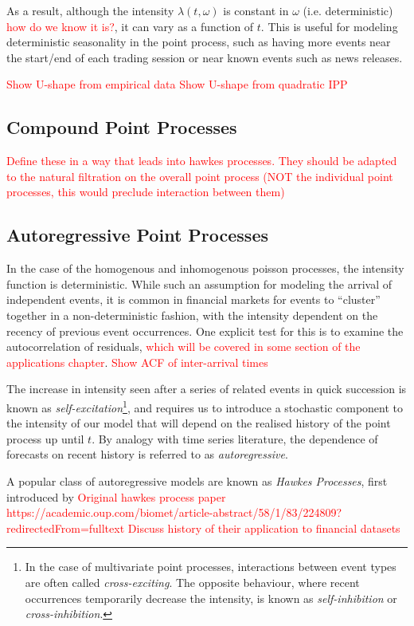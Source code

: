 \documentclass[honours,12pt]{unswthesis}
\numberwithin{equation}{section}
\begin{document}
As a result, although the intensity $\lambda(t,\omega)$ is constant in $\omega$ (i.e. deterministic) \textcolor{red}{how do we know it is?}, it can vary as a function of $t$. This is useful for modeling deterministic seasonality in the point process, such as having more events near the start/end of each trading session or near known events such as news releases.

\textcolor{red}{Show U-shape from empirical data}
\textcolor{red}{Show U-shape from quadratic IPP}

\subsection{Compound Point Processes}
\textcolor{red}{Define these in a way that leads into hawkes processes. They should be adapted to the natural filtration on the overall point process (NOT the individual point processes, this would preclude interaction between them)}

\subsection{Autoregressive Point Processes}
In the case of the homogenous and inhomogenous poisson processes, the intensity function is deterministic. While such an assumption for modeling the arrival of independent events, it is common in financial markets for events to ``cluster'' together in a non-deterministic fashion, with the intensity dependent on the recency of previous event occurrences. One explicit test for this is to examine the autocorrelation of residuals, \textcolor{red}{which will be covered in some section of the applications chapter}.
\textcolor{red}{Show ACF of inter-arrival times}

The increase in intensity seen after a series of related events in quick succession is known as \textit{self-excitation}\footnote{In the case of multivariate point processes, interactions between event types are often called \textit{cross-exciting}. The opposite behaviour, where recent occurrences temporarily decrease the intensity, is known as \textit{self-inhibition} or \textit{cross-inhibition}.}, and requires us to introduce a stochastic component to the intensity of our model that will depend on the realised history of the point process up until $t$. By analogy with time series literature, the dependence of forecasts on recent history is referred to as \textit{autoregressive}.

A popular class of autoregressive models are known as \textit{Hawkes Processes}, first introduced by 
\textcolor{red}{Original hawkes process paper https://academic.oup.com/biomet/article-abstract/58/1/83/224809?redirectedFrom=fulltext}
\textcolor{red}{Discuss history of their application to financial datasets}
\end{document}
